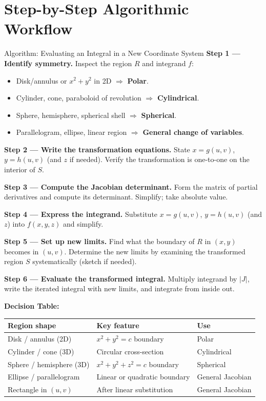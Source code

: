 \documentclass[12pt,a4paper]{article}
\begin{document}
\section{Step-by-Step Algorithmic Workflow}

\begin{infobox}{Algorithm: Evaluating an Integral in a New Coordinate System}
\textbf{Step 1 --- Identify symmetry.}
Inspect the region $R$ and integrand $f$:
\begin{itemize}[leftmargin=1.5em]
  \item Disk/annulus or $x^2+y^2$ in 2D $\Rightarrow$ \textbf{Polar}.
  \item Cylinder, cone, paraboloid of revolution $\Rightarrow$ \textbf{Cylindrical}.
  \item Sphere, hemisphere, spherical shell $\Rightarrow$ \textbf{Spherical}.
  \item Parallelogram, ellipse, linear region $\Rightarrow$ \textbf{General change of variables}.
\end{itemize}

\textbf{Step 2 --- Write the transformation equations.}
State $x=g(u,v)$, $y=h(u,v)$ (and $z$ if needed). Verify the transformation is one-to-one on the
interior of $S$.

\textbf{Step 3 --- Compute the Jacobian determinant.}
Form the matrix of partial derivatives and compute its determinant. Simplify; take absolute value.

\textbf{Step 4 --- Express the integrand.}
Substitute $x = g(u,v)$, $y = h(u,v)$ (and $z$) into $f(x,y,z)$ and simplify.

\textbf{Step 5 --- Set up new limits.}
Find what the boundary of $R$ in $(x,y)$ becomes in $(u,v)$. Determine the new limits by examining
the transformed region $S$ systematically (sketch if needed).

\textbf{Step 6 --- Evaluate the transformed integral.}
Multiply integrand by $|J|$, write the iterated integral with new limits, and integrate from inside
out.

\textbf{Decision Table:}
\begin{center}
\begin{tabular}{lll}
\toprule
\textbf{Region shape} & \textbf{Key feature} & \textbf{Use} \\
\midrule
Disk / annulus (2D) & $x^2+y^2 = c$ boundary & Polar \\
Cylinder / cone (3D) & Circular cross-section & Cylindrical \\
Sphere / hemisphere (3D) & $x^2+y^2+z^2 = c$ boundary & Spherical \\
Ellipse / parallelogram & Linear or quadratic boundary & General Jacobian \\
Rectangle in $(u,v)$ & After linear substitution & General Jacobian \\
\bottomrule
\end{tabular}
\end{center}
\end{infobox}
\end{document}
